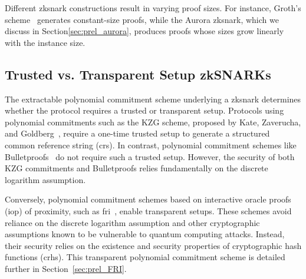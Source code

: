 Different \gls{zksnark} constructions result in varying proof sizes. For instance, Groth's scheme~\cite{Groth2016} generates constant-size proofs, while the Aurora \gls{zksnark}\cite{Aurora2019}, which we discuss in Section\ref{sec:prel_aurora}, produces proofs whose sizes grow linearly with the instance size.

\subsection{Trusted vs. Transparent Setup zkSNARKs}

The extractable polynomial commitment scheme underlying a \gls{zksnark} determines whether the protocol requires a trusted or transparent setup. Protocols using polynomial commitments such as the KZG scheme, proposed by Kate, Zaverucha, and Goldberg~\cite{KZG2010}, require a one-time trusted setup to generate a structured common reference string (\gls{crs}). In contrast, polynomial commitment schemes like Bulletproofs~\cite{Bulletproofs2018} do not require such a trusted setup. However, the security of both KZG commitments and Bulletproofs relies fundamentally on the discrete logarithm assumption.

Conversely, polynomial commitment schemes based on interactive oracle proofs (\gls{iop}) of proximity, such as \gls{fri}~\cite{FRI2018}, enable transparent setups. These schemes avoid reliance on the discrete logarithm assumption and other cryptographic assumptions known to be vulnerable to quantum computing attacks. Instead, their security relies on the existence and security properties of cryptographic hash functions (\glspl{crh}). This transparent polynomial commitment scheme is detailed further in Section~\ref{sec:prel_FRI}.






%

